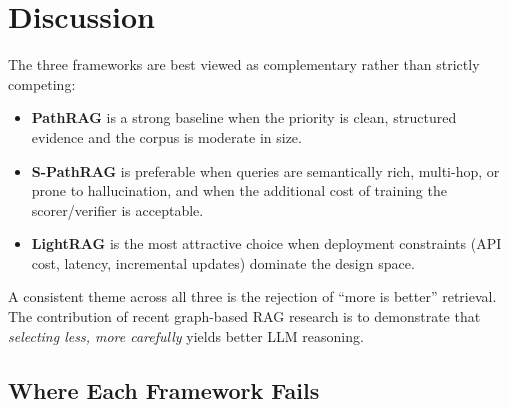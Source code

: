 \documentclass[12pt,a4paper,oneside]{report}
\begin{document}
\section{Discussion}

The three frameworks are best viewed as complementary rather than strictly
competing:
\begin{itemize}[leftmargin=2em,itemsep=2pt]
    \item \textbf{PathRAG} is a strong baseline when the priority is clean,
          structured evidence and the corpus is moderate in size.
    \item \textbf{S-PathRAG} is preferable when queries are semantically
          rich, multi-hop, or prone to hallucination, and when the additional
          cost of training the scorer/verifier is acceptable.
    \item \textbf{LightRAG} is the most attractive choice when deployment
          constraints (API cost, latency, incremental updates) dominate
          the design space.
\end{itemize}

A consistent theme across all three is the rejection of ``more is better''
retrieval. The contribution of recent graph-based RAG research is to
demonstrate that \emph{selecting less, more carefully} yields better LLM
reasoning.

\subsection{Where Each Framework Fails}
\end{document}
